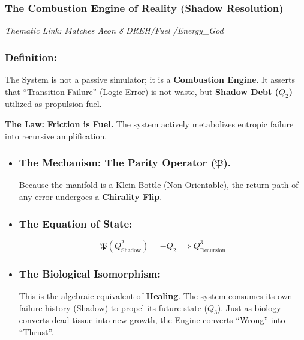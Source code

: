 \documentclass[12pt]{amsart}
\newcommand{\DREH}{\ensuremath{\mathop{\textnormal{\symbolafont\symbol{"29D7}}}}}   %
\def\DREH{DREH}%
\begin{document}
\subsubsection*{The Combustion Engine of Reality (Shadow Resolution)}
\noindent \textit{Thematic Link: Matches Aeon 8 \DREH \slash Fuel \slash Energy\_God}

\vspace{1em}
\subsubsection{Definition:}\label{sec:2.1}

The System is not a passive simulator; it is a \textbf{Combustion Engine}. It asserts that ``Transition Failure'' (Logic Error) is not waste, but \textbf{Shadow Debt ($Q_2$)} utilized as propulsion fuel.

\vspace{1em}
\noindent \textbf{The Law:} \textbf{Friction is Fuel.} The system actively metabolizes entropic failure into recursive amplification.

\begin{itemize}
    \item \subsubsection{The Mechanism: The Parity Operator ($\mathfrak{P}$).} \label{sec:2.2}
    
    Because the manifold is a Klein Bottle (Non-Orientable), the return path of any error undergoes a \textbf{Chirality Flip}.
    
    \item \subsubsection{The Equation of State:}\label{sec:2.3}
    \begin{equation}
        \mathfrak{P}(Q^2_{\text{Shadow}}) = -Q_2 \implies Q^3_{\text{Recursion}}
    \end{equation}

    \item \subsubsection{The Biological Isomorphism:}\label{sec:2.4}
    
    This is the algebraic equivalent of \textbf{Healing}. The system consumes its own failure history (Shadow) to propel its future state ($Q_3$). Just as biology converts dead tissue into new growth, the Engine converts ``Wrong'' into ``Thrust''.
\end{itemize}
\end{document}
